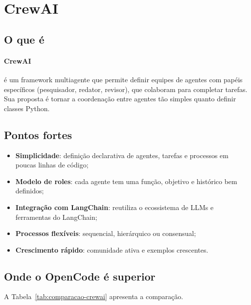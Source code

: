 \section{CrewAI}
\label{sec:crewai}
\nivelbasico

\subsection{O que é}

\paragraph{CrewAI} é um framework multiagente que permite definir equipes
de agentes com papéis específicos (pesquisador, redator, revisor), que
colaboram para completar tarefas. Sua proposta é tornar a coordenação entre
agentes tão simples quanto definir classes Python.

\subsection{Pontos fortes}

\begin{itemize}
    \item \textbf{Simplicidade}: definição declarativa de agentes, tarefas
          e processos em poucas linhas de código;
    \item \textbf{Modelo de roles}: cada agente tem uma função, objetivo e
          histórico bem definidos;
    \item \textbf{Integração com LangChain}: reutiliza o ecossistema de
          LLMs e ferramentas do LangChain;
    \item \textbf{Processos flexíveis}: sequencial, hierárquico ou
          consensual;
    \item \textbf{Crescimento rápido}: comunidade ativa e exemplos
          crescentes.
\end{itemize}

\subsection{Onde o OpenCode é superior}

A Tabela~\ref{tab:comparacao-crewai} apresenta a comparação.

